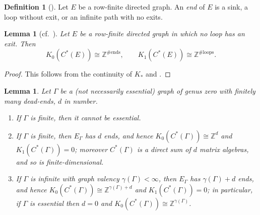 \documentclass[12pt,reqno]{amsart}
\theoremstyle{plain}
\newtheorem{lemma}[theorem]{Lemma}
\theoremstyle{definition}
\newtheorem{definition}[theorem]{Definition}
\newcommand{\Z}{\mathbb{Z}}
\begin{document}
\begin{definition}[{\cite[Definition~3.6]{PRennie}}]\label{def:end}
Let $E$ be a row-finite directed graph. An \emph{end} of $E$ is a sink, a loop without exit, or an
infinite path with no exits.
\end{definition}

\begin{lemma}[{cf.\ \cite[Lemma~6.1]{PRennie}}]\label{lem:ends-ktheory}
Let $E$ be a row-finite directed graph in which no loop has an exit. Then
\[
K_0(C^*(E))\cong\Z^{\#\mathrm{ends}},\qquad K_1(C^*(E))\cong\Z^{\#\mathrm{loops}}.
\]
\end{lemma}

\begin{proof}
This follows from the continuity of $K_*$ and \cite[Corollary~5.3]{RS}.
\end{proof}

\begin{lemma}\label{lem:branching-ends}
Let $\Gamma$ be a \textup(not necessarily essential\textup) graph of genus zero with finitely many
dead-ends, $d$ in number.
\begin{enumerate}
\item If $\Gamma$ is finite, then it cannot be essential.
\item If $\Gamma$ is finite, then $E_\Gamma$ has $d$ ends, and hence
$K_0(C^*(\Gamma))\cong\Z^{d}$ and $K_1(C^*(\Gamma))=0$; moreover $C^*(\Gamma)$ is a direct sum of
$d$ matrix algebras, and so is finite-dimensional.
\item If $\Gamma$ is infinite with graph valency $\gamma(\Gamma)<\infty$, then $E_\Gamma$ has
$\gamma(\Gamma)+d$ ends, and hence $K_0(C^*(\Gamma))\cong\Z^{\gamma(\Gamma)+d}$ and
$K_1(C^*(\Gamma))=0$; in particular, if $\Gamma$ is essential then $d=0$ and
$K_0(C^*(\Gamma))\cong\Z^{\gamma(\Gamma)}$.
\end{enumerate}
\end{lemma}
\end{document}
